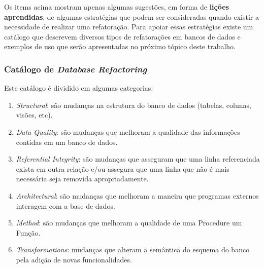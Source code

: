 \documentclass[10pt]{article}
\begin{document}
	Os items acima mostram apenas algumas sugestões, em forma de \textbf{lições aprendidas}, de algumas estratégias que podem ser consideradas quando existir a necessidade de realizar uma refatoração. Para apoiar essas estratégias existe um catálogo que descrevem diversos tipos de refatorações em bancos de dados e exemplos de uso que serão apresentadas no próximo tópico deste trabalho.

\subsubsection{Catálogo de \textit{Database Refactoring}}
	Este catálogo é dividido em algumas categorias:

	\begin{enumerate}
		\item \textit{Structural}: são mudanças na estrutura do banco de dados (tabelas, colunas, visões, etc).
		\item \textit{Data Quality}: são mudanças que melhoram a qualidade das informações contidas em um banco de dados.
		\item \textit{Referential Integrity}: são mudanças que asseguram que uma linha referenciada exista em outra relação e/ou assegura que uma linha que não é mais necessária seja removida apropriadamente.
		\item \textit{Architectural}: são mudanças que melhoram a maneira que programas externos interagem com a base de dados.
		\item \textit{Method}: são mudanças que melhoram a qualidade de uma Procedure um Função.
		\item \textit{Transformations}: mudanças que alteram a semântica do esquema do banco pela adição de novas funcionalidades.
	\end{enumerate}
\end{document}
